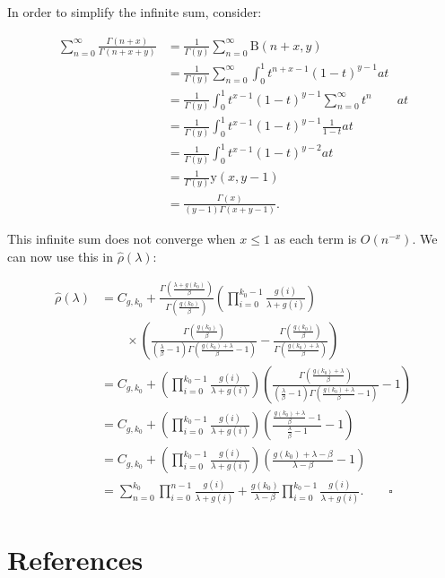 \documentclass[
  sn-basic,
  10pt,
]{sn-jnl}
\theoremstyle{plain}
\theoremstyle{plain}
\theoremstyle{remark}
\begin{document}
In order to simplify the infinite sum, consider:

\begin{align*}
\sum_{n=0}^\infty\frac{\Gamma(n+x)}{\Gamma(n+x+y)} &=\frac{1}{\Gamma(y)}\sum_{n=0}^\infty \text{B}(n+x,y)\\
&=\frac{1}{\Gamma(y)}\sum_{n=0}^\infty\int_0^1t^{n+x-1}(1-t)^{y-1}at\\
&=\frac{1}{\Gamma(y)}\int_0^1 t^{x-1}(1-t)^{y-1}\sum_{n=0}^\infty t^n\qquad at\\
&=\frac{1}{\Gamma(y)}\int_0^1 t^{x-1}(1-t)^{y-1}\frac{1}{1-t}at\\
&=\frac{1}{\Gamma(y)}\int_0^1 t^{x-1}(1-t)^{y-2}at\\
&=\frac{1}{\Gamma(y)}\text{y}(x,y-1)\\
&= \frac{\Gamma(x)}{(y-1)\Gamma(x+y-1)}.
\end{align*}

This infinite sum does not converge when \(x\le1\) as each term is
\(O(n^{-x})\). We can now use this in \(\hat\rho(\lambda)\):

\begin{align*}
\hat\rho(\lambda) &= C_{g,k_0} + \frac{\Gamma\left(\frac{\lambda+g(k_0)}{\beta}\right)}{\Gamma\left(\frac{g(k_0)}{\beta}\right)}\left(\prod_{i=0}^{k_0-1}\frac{g(i)}{\lambda+g(i)}\right)\\&\qquad \times\left(\frac{\Gamma\left(\frac{g(k_0)}{\beta}\right)}{\left(\frac{\lambda}{\beta}-1\right)\Gamma\left(\frac{g(k_0)+\lambda}{\beta}-1\right)}-\frac{\Gamma\left(\frac{g(k_0)}{\beta}\right)}{\Gamma\left(\frac{g(k_0)+\lambda}{\beta}\right)}\right)\\
&=C_{g,k_0} + \left(\prod_{i=0}^{k_0-1}\frac{g(i)}{\lambda+g(i)}\right)\left(\frac{\Gamma\left(\frac{g(k_0)+\lambda}{\beta}\right)}{\left(\frac{\lambda}{\beta}-1\right)\Gamma\left(\frac{g(k_0)+\lambda}{\beta}-1\right)}-1\right)\\
&=C_{g,k_0} + \left(\prod_{i=0}^{k_0-1}\frac{g(i)}{\lambda+g(i)}\right)\left(\frac{\frac{g(k_0)+\lambda}{\beta}-1}{\frac{\lambda}{\beta}-1}-1\right)\\
&=C_{g,k_0} + \left(\prod_{i=0}^{k_0-1}\frac{g(i)}{\lambda+g(i)}\right)\left(\frac{g(k_0)+\lambda-\beta}{\lambda-\beta}-1\right)\\&=\sum_{n=0}^{k_0}\prod_{i=0}^{n-1}\frac{g(i)}{\lambda+g(i)} + \frac{g(k_0)}{\lambda-\beta}\prod_{i=0}^{k_0-1}\frac{g(i)}{\lambda+g(i)}.\qquad  \square
\end{align*}

\newpage

\section*{References}\label{references}

\renewcommand{\bibsection}{}

\end{document}
